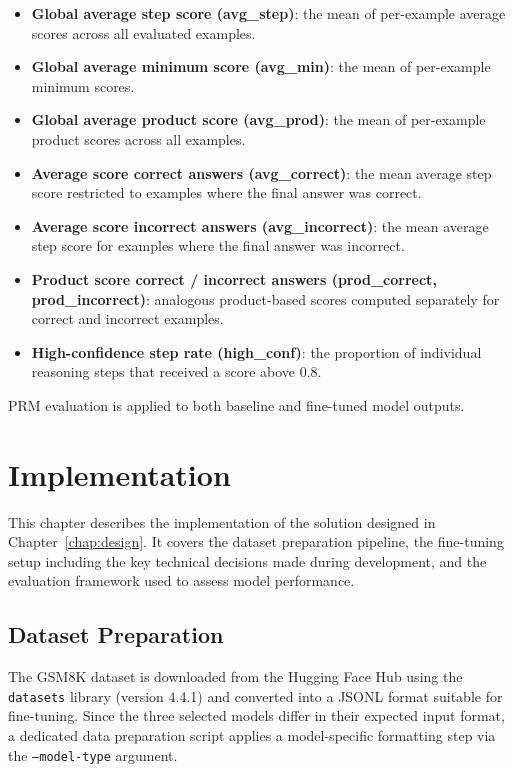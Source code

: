   \begin{itemize}
      \item \textbf{Global average step score (avg\_step)}: the
      mean of per-example average scores across all
      evaluated examples.
      \item \textbf{Global average minimum score (avg\_min)}:
      the mean of per-example minimum scores.
      \item \textbf{Global average product score (avg\_prod)}:
      the mean of per-example product scores across
      all examples.
      \item \textbf{Average score correct answers (avg\_correct)}:
      the mean average step score restricted to
      examples where the final answer was correct.
      \item \textbf{Average score incorrect answers (avg\_incorrect)}:
      the mean average step score for examples where
      the final answer was incorrect.
      \item \textbf{Product score correct / incorrect
      answers (prod\_correct, prod\_incorrect)}: analogous product-based scores
      computed separately for correct and incorrect
      examples.
      \item \textbf{High-confidence step rate (high\_conf)}: the
      proportion of individual reasoning steps that
      received a score above 0.8.
  \end{itemize}
  PRM evaluation is applied to both baseline and fine-tuned
  model outputs.
\chapter{Implementation}
\label{chap:implementation}
This chapter describes the implementation of the
  solution designed in Chapter~\ref{chap:design}.
  It covers the dataset preparation pipeline, the
  fine-tuning setup including the key technical
  decisions made during development, and the
  evaluation framework used to assess model
  performance.
\section{Dataset Preparation}
\label{sec:dataset-prep}
The GSM8K dataset is downloaded from the
  Hugging Face Hub using the \texttt{datasets}
  library (version 4.4.1) and converted into
  a JSONL format suitable for fine-tuning.
  Since the three selected models differ in
  their expected input format, a dedicated
  data preparation script applies a
  model-specific formatting step via the
  \texttt{--model-type} argument.

